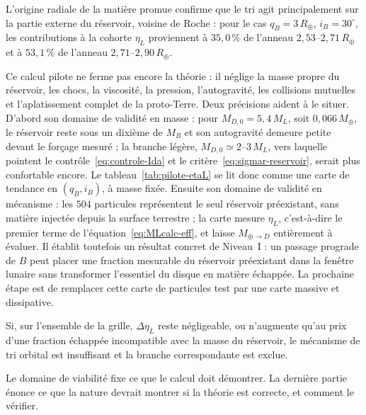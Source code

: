 \documentclass[11pt,a4paper,openany]{report}
\newcommand{\Mt}{M_{\oplus}}
\newcommand{\Rt}{R_{\oplus}}
\begin{document}
L'origine radiale de la matière promue confirme que le tri agit principalement sur la partie externe
du réservoir, voisine de Roche : pour le cas $q_B=3\,\Rt$, $i_B=30^\circ$, les contributions à la
cohorte $\eta_L$ proviennent à $35{,}0\,\%$ de l'anneau $2{,}53$--$2{,}71\,\Rt$ et à
$53{,}1\,\%$ de l'anneau $2{,}71$--$2{,}90\,\Rt$.

\begin{controle}
Ce calcul pilote ne ferme pas encore la théorie : il néglige la masse propre du réservoir, les chocs,
la viscosité, la pression, l'autogravité, les collisions mutuelles et l'aplatissement complet de la
proto-Terre. Deux précisions aident à le situer. D'abord son domaine de validité en masse : pour
$M_{D,0}=5{,}4\,M_L$, soit $0{,}066\,\Mt$, le réservoir reste sous un dixième de $M_B$ et son
autogravité demeure petite devant le forçage mesuré ; la branche légère, $M_{D,0}\simeq2$--$3\,M_L$,
vers laquelle pointent le contrôle~\eqref{eq:controle-Ida} et le
critère~\eqref{eq:sigmar-reservoir}, serait plus confortable encore. Le
tableau~\ref{tab:pilote-etaL} se lit donc comme une carte de tendance en $(q_B,i_B)$, à masse
fixée. Ensuite son domaine de validité en mécanisme : les $504$ particules représentent le seul
réservoir préexistant, sans matière injectée depuis la surface terrestre ; la carte mesure
$\eta_L$, c'est-à-dire le premier terme de l'équation~\eqref{eq:MLcalc-eff}, et laisse
$M_{\oplus\to D}$ entièrement à évaluer. Il établit toutefois un résultat concret de Niveau~I : un passage prograde de $B$ peut
placer une fraction mesurable du réservoir préexistant dans la fenêtre lunaire sans transformer
l'essentiel du disque en matière échappée. La prochaine étape est de remplacer cette carte de
particules test par une carte massive et dissipative.
\end{controle}

\begin{falsif}
Si, sur l'ensemble de la grille, $\Delta\eta_L$ reste négligeable, ou n'augmente qu'au prix d'une
fraction échappée incompatible avec la masse du réservoir, le mécanisme de tri orbital est
insuffisant et la branche correspondante est exclue.
\end{falsif}

\begin{rappel}
Le domaine de viabilité fixe ce que le calcul doit démontrer. La dernière partie énonce ce que la
nature devrait montrer si la théorie est correcte, et comment le vérifier.
\end{rappel}
\end{document}

